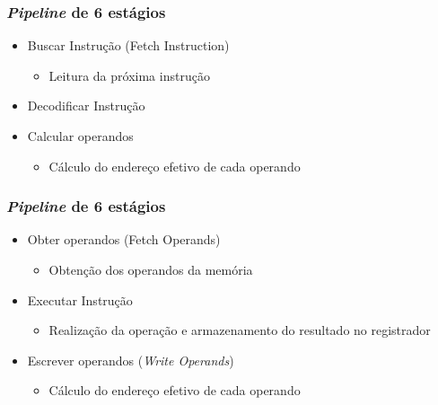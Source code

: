 \documentclass[aspectratio=169,
				xcolor=table]{beamer}
\begin{document}
	\begin{frame}[t]
		\frametitle{\textit{Pipeline} de 6 estágios}
		\begin{itemize}
			\item Buscar Instrução (Fetch Instruction)
			\begin{itemize}
				\item Leitura da próxima instrução 
			\end{itemize}
			\vspace{1em}
			\item Decodificar Instrução
			\vspace{1em}
			\item Calcular operandos
			\begin{itemize}
				\item Cálculo do endereço efetivo de cada operando
			\end{itemize}

		\end{itemize}
	\end{frame}

	\begin{frame}
		\frametitle{\textit{Pipeline} de 6 estágios}
		\begin{itemize}
			\item Obter operandos (Fetch Operands)
			\begin{itemize}
				\item Obtenção dos operandos da memória
			\end{itemize}
			\vspace{1em}
			\item Executar Instrução
			\begin{itemize}
				\item Realização da operação e armazenamento do resultado no registrador
			\end{itemize}
			\vspace{1em}
			\item Escrever operandos (\textit{Write Operands})
			\begin{itemize}
				\item Cálculo do endereço efetivo de cada operando
			\end{itemize}

		\end{itemize}
	\end{frame}
	
\end{document}
